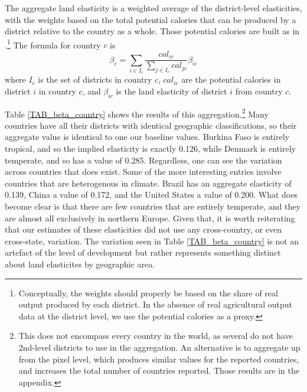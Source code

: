 \documentclass[12pt]{article}
\begin{document}
The aggregate land elasticity is a weighted average of the district-level elasticities, with the weights based on the total potential calories that can be produced by a district relative to the country as a whole. Those potential calories are built as in \citet{galorozak2016}.\footnote{Conceptually, the weights should properly be based on the share of real output produced by each district. In the absence of real agricultural output data at the district level, we use the potential calories as a proxy.} The formula for country $c$ is
\begin{equation}
 	\beta_c = \sum_{i \in I_c} \frac{cal_{ic}}{\sum_{j \in I_c} cal_{jc}} \beta_{ic}
 \end{equation} 
 where $I_c$ is the set of districts in country $c$, $cal_{ic}$ are the potential calories in district $i$ in country $c$, and $\beta_{ic}$ is the land elasticity of district $i$ from country $c$.

Table \ref{TAB_beta_country} shows the results of this aggregation.\footnote{This does not encompass every country in the world, as several do not have 2nd-level districts to use in the aggregation. An alternative is to aggregate up from the pixel level, which produces similar values for the reported countries, and increases the total number of countries reported. Those results are in the appendix.} Many countries have all their districts with identical geographic classifications, so their aggregate value is identical to one our baseline values. Burkina Faso is entirely tropical, and so the implied elasticity is exactly 0.126, while Denmark is entirely temperate, and so has a value of 0.285. Regardless, one can see the variation across countries that does exist. Some of the more interesting entries involve countries that are heterogenous in climate. Brazil has an aggregate elasticity of 0.139, China a value of 0.172, and the United States a value of 0.200. What does become clear is that there are few countries that are entirely temperate, and they are almost all exclusively in northern Europe. Given that, it is worth reiterating that our estimates of these elasticities did not use any cross-country, or even cross-state, variation. The variation seen in Table \ref{TAB_beta_country} is not an artefact of the level of development but rather represents something distinct about land elasticites by geographic area.
\end{document}
